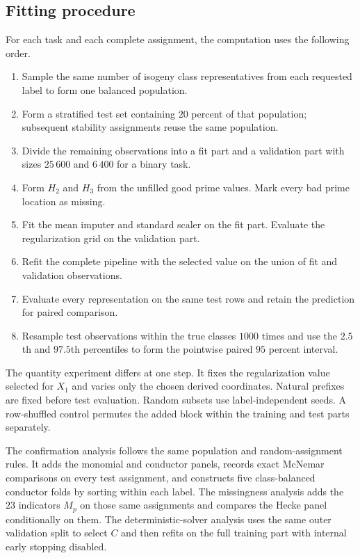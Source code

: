 \documentclass[12pt,reqno]{amsart}
\numberwithin{equation}{section}
\theoremstyle{plain}
\theoremstyle{definition}
\theoremstyle{remark}
\begin{document}
\subsection{Fitting procedure}

For each task and each complete assignment, the computation uses the following order.

\begin{enumerate}
\item Sample the same number of isogeny class representatives from each requested label to form one balanced population.
\item Form a stratified test set containing $20$ percent of that population; subsequent stability assignments reuse the same population.
\item Divide the remaining observations into a fit part and a validation part with sizes $25\,600$ and $6\,400$ for a binary task.
\item Form $H_2$ and $H_3$ from the unfilled good prime values.
Mark every bad prime location as missing.
\item Fit the mean imputer and standard scaler on the fit part.
Evaluate the regularization grid on the validation part.
\item Refit the complete pipeline with the selected value on the union of fit and validation observations.
\item Evaluate every representation on the same test rows and retain the prediction for paired comparison.
\item Resample test observations within the true classes $1000$ times and use the $2.5$th and $97.5$th percentiles to form the pointwise paired $95$ percent interval.
\end{enumerate}

The quantity experiment differs at one step.
It fixes the regularization value selected for $X_1$ and varies only the chosen derived coordinates.
Natural prefixes are fixed before test evaluation.
Random subsets use label-independent seeds.
A row-shuffled control permutes the added block within the training and test parts separately.

The confirmation analysis follows the same population and random-assignment rules.
It adds the monomial and conductor panels, records exact McNemar comparisons on every test assignment, and constructs five class-balanced conductor folds by sorting within each label.
The missingness analysis adds the $23$ indicators $M_p$ on those same assignments and compares the Hecke panel conditionally on them.
The deterministic-solver analysis uses the same outer validation split to select $C$ and then refits on the full training part with internal early stopping disabled.
\end{document}
